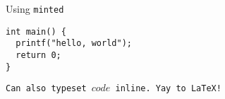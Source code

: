 
\begin{frame}[fragile]{Using \texttt{minted}}
\begin{verbatim}
int main() {
  printf("hello, world");
  return 0;
}
\end{verbatim}
\texttt{Can also typeset $code$ inline. Yay to \LaTeX{}!}
\end{frame}


